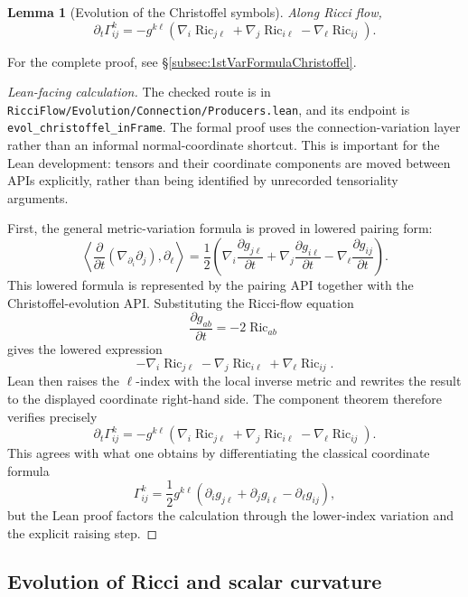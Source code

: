 \documentclass[11pt]{article}
\theoremstyle{plain}
\newtheorem{lemma}[theorem]{Lemma}
\theoremstyle{definition}
\theoremstyle{remark}
\newcommand{\Ric}{\operatorname{Ric}}
\newcommand{\leanref}[1]{\nolinkurl{#1}}
\newcommand{\leanfile}[1]{\nolinkurl{#1}}
\newcommand{\rffile}[1]{\leanfile{#1}}
\begin{document}
\begin{lemma}[Evolution of the Christoffel symbols]
\label{lem:evol-christoffel}
Along Ricci flow,
\[
\partial_t\Gamma^k_{ij}
=
-g^{k\ell}
\left(
\nabla_i\Ric_{j\ell}
+
\nabla_j\Ric_{i\ell}
-
\nabla_\ell\Ric_{ij}
\right).
\]
\end{lemma}

For the complete proof, see \S \ref{subsec:1stVarFormulaChristoffel}.

\begin{proof}[Lean-facing calculation]
The checked route is in \rffile{RicciFlow/Evolution/Connection/Producers.lean},
and its endpoint is \leanref{evol_christoffel_inFrame}.  The formal proof uses
the connection-variation layer rather than an informal normal-coordinate
shortcut.  This is important for the Lean development: tensors and their
coordinate components are moved between APIs explicitly, rather than being
identified by unrecorded tensoriality arguments.

First, the general metric-variation formula is proved in lowered pairing form:
\[
  \left\langle
    \frac{\partial}{\partial t}(\nabla_{\partial_i}\partial_j),\partial_\ell
  \right\rangle
  =
  \frac12\left(
    \nabla_i\frac{\partial g_{j\ell}}{\partial t}
    +\nabla_j\frac{\partial g_{i\ell}}{\partial t}
    -\nabla_\ell\frac{\partial g_{ij}}{\partial t}
  \right).
\]
This lowered formula is represented by the pairing API together with the
Christoffel-evolution API.  Substituting the Ricci-flow equation
\[
  \frac{\partial g_{ab}}{\partial t}=-2\Ric_{ab}
\]
gives the lowered expression
\[
  -\nabla_i\Ric_{j\ell}
  -\nabla_j\Ric_{i\ell}
  +\nabla_\ell\Ric_{ij}.
\]
Lean then raises the \(\ell\)-index with the local inverse metric and rewrites
the result to the displayed coordinate right-hand side.  The component theorem
therefore verifies precisely
\[
  \partial_t\Gamma^k_{ij}
  =
  -g^{k\ell}
  \left(
    \nabla_i\Ric_{j\ell}
    +\nabla_j\Ric_{i\ell}
    -\nabla_\ell\Ric_{ij}
  \right).
\]
This agrees with what one obtains by differentiating the classical coordinate
formula
\[
  \Gamma^k_{ij}
  =
  \frac12g^{k\ell}
  \left(
    \partial_ig_{j\ell}
    +\partial_jg_{i\ell}
    -\partial_\ell g_{ij}
  \right),
\]
but the Lean proof factors the calculation through the lower-index variation
and the explicit raising step.
\end{proof}

\subsection{Evolution of Ricci and scalar curvature}
\end{document}
